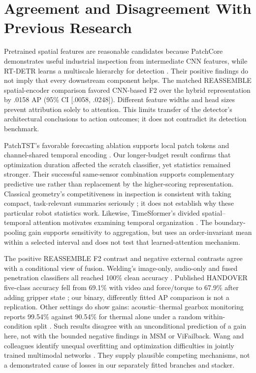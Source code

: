 \section{Agreement and Disagreement With Previous Research}
Pretrained spatial features are reasonable candidates because PatchCore demonstrates useful industrial inspection from intermediate CNN features, while RT-DETR learns a multiscale hierarchy for detection \citep{Roth2022Towards,Zhao2024RTDETR}. Their positive findings do not imply that every downstream component helps. The matched REASSEMBLE spatial-encoder comparison favored CNN-based F2 over the hybrid representation by .0158 AP (95\% CI [.0058, .0248]). Different feature widths and head sizes prevent attribution solely to attention. This limits transfer of the detector's architectural conclusions to action outcomes; it does not contradict its detection benchmark.

PatchTST's favorable forecasting ablation supports local patch tokens and channel-shared temporal encoding \citep{Nie2023PatchTST}. Our longer-budget result confirms that optimization duration affected the scratch classifier, yet statistics remained stronger. Their successful same-sensor combination supports complementary predictive use rather than replacement by the higher-scoring representation. Classical geometry's competitiveness in inspection is consistent with taking compact, task-relevant summaries seriously \citep{Horwitz2023Back}; it does not establish why these particular robot statistics work. Likewise, TimeSformer's divided spatial--temporal attention motivates examining temporal organization \citep{P034}. The boundary-pooling gain supports sensitivity to aggregation, but uses an order-invariant mean within a selected interval and does not test that learned-attention mechanism.

The positive REASSEMBLE F2 contrast and negative external contrasts agree with a conditional view of fusion. Welding's image-only, audio-only and fused penetration classifiers all reached 100\% clean accuracy \citep[Tables~1--3]{Hua2026Weld}. Published HANDOVER five-class accuracy fell from 69.1\% with video and force/torque to 67.9\% after adding gripper state \citep[Table~III]{Thoduka2024Handover}; our binary, differently fitted AP comparison is not a replication. Other settings do show gains: acoustic--thermal gearbox monitoring reports 99.54\% against 90.54\% for thermal alone under a random within-condition split \citep[Table~2]{Ying2025Trustworthy}. Such results disagree with an unconditional prediction of a gain here, not with the bounded negative findings in MSM or ViFailback. Wang and colleagues identify unequal overfitting and optimization difficulties in jointly trained multimodal networks \citep{Wang2020What}. They supply plausible competing mechanisms, not a demonstrated cause of losses in our separately fitted branches and stacker.

